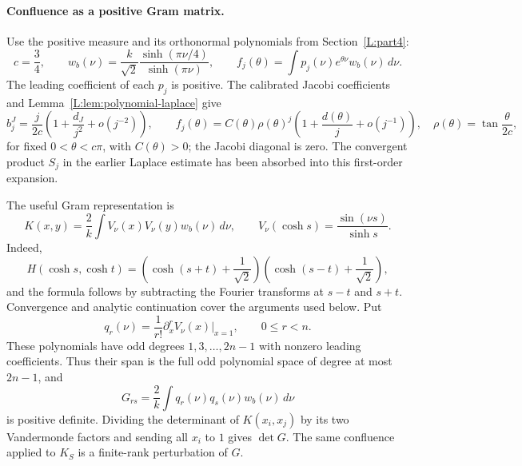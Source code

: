 \paragraph{Confluence as a positive Gram matrix.}
Use the positive measure and its orthonormal polynomials from
Section~\ref{L:part4}:
\[
 c=\frac34,\qquad
 w_b(\nu)=\frac{k}{\sqrt2}\frac{\sinh(\pi\nu/4)}{\sinh(\pi\nu)},
 \qquad
 f_j(\theta)=\int p_j(\nu)e^{\theta\nu}w_b(\nu)\,d\nu.
\]
The leading coefficient of each $p_j$ is positive. The calibrated Jacobi coefficients and Lemma~\ref{L:lem:polynomial-laplace} give
\[
 b_j^{J}=\frac{j}{2c}
       \left(1+\frac{d_J}{j^2}+o(j^{-2})\right),
 \qquad
 f_j(\theta)=C(\theta)\rho(\theta)^j
       \left(1+\frac{d(\theta)}j+o(j^{-1})\right),
 \quad
 \rho(\theta)=\tan\frac{\theta}{2c},
\]
for fixed $0<\theta<c\pi$, with $C(\theta)>0$; the Jacobi diagonal is
zero. The convergent product $S_j$ in the earlier Laplace estimate has
been absorbed into this first-order expansion.

The useful Gram representation is
\[
 K(x,y)=\frac2k\int V_\nu(x)V_\nu(y)w_b(\nu)\,d\nu,
 \qquad
 V_\nu(\cosh s)=\frac{\sin(\nu s)}{\sinh s}.
\]
Indeed,
\[
 H(\cosh s,\cosh t)
 =\left(\cosh(s+t)+\frac1{\sqrt2}\right)
  \left(\cosh(s-t)+\frac1{\sqrt2}\right),
\]
and the formula follows by subtracting the Fourier transforms at $s-t$
and $s+t$. Convergence and analytic continuation cover the arguments
used below. Put
\[
 q_r(\nu)=\frac1{r!}\partial_x^r V_\nu(x)\big|_{x=1},
 \qquad 0\le r<n.
\]
These polynomials have odd degrees $1,3,\ldots,2n-1$ with nonzero
leading coefficients. Thus their span is the full odd polynomial space
of degree at most $2n-1$, and
\[
 G_{rs}=\frac2k\int q_r(\nu)q_s(\nu)w_b(\nu)\,d\nu
\]
is positive definite. Dividing the determinant of $K(x_i,x_j)$ by its
two Vandermonde factors and sending all $x_i$ to $1$ gives $\det G$.
The same confluence applied to $K_S$ is a finite-rank perturbation of $G$.

